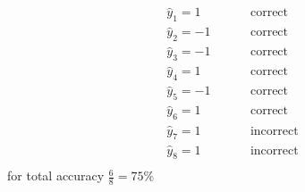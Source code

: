 \documentclass[11pt]{article}
\begin{document}
{\begin{enumerate}
\begin{enumerate}
                    \begin{align*}
                        \hat y_1 = 1 &\hspace{1cm} \text{correct}\\                        
                        \hat y_2 = -1 &\hspace{1cm} \text{correct}\\                        
                        \hat y_3 = -1 &\hspace{1cm} \text{correct}\\                        
                        \hat y_4 = 1 &\hspace{1cm} \text{correct}\\                        
                        \hat y_5 = -1 &\hspace{1cm} \text{correct}\\                        
                        \hat y_6 = 1 &\hspace{1cm} \text{correct}\\                        
                        \hat y_7 = 1 &\hspace{1cm} \text{incorrect}\\                        
                        \hat y_8 = 1 &\hspace{1cm} \text{incorrect}\\                        
                    \end{align*}
                    for total accuracy $\frac{6}{8} = 75\%$
            \end{enumerate}

    \end{enumerate}
}
\end{document}
